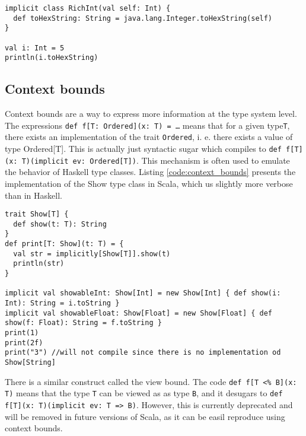 \begin{lstlisting}[caption=Implicit class, label=code:implicit_classes, float]
implicit class RichInt(val self: Int) {
  def toHexString: String = java.lang.Integer.toHexString(self)
}

val i: Int = 5
println(i.toHexString)
\end{lstlisting}

\subsection{Context bounds}
Context bounds are a way to express more information at the type system level. The expressions \texttt{def f[T: Ordered](x: T) = \ldots} means that for a given type\texttt{T}, there exists an implementation of the trait \texttt{Ordered}, i. e. there exists a value of type Ordered[T]. This is actually just syntactic sugar which compiles to \texttt{def f[T](x: T)(implicit ev: Ordered[T])}. This mechanism is often used to emulate the behavior of Haskell type classes. Listing \ref{code:context_bounds} presents the implementation of the Show type class in Scala, which us slightly more verbose than in Haskell.

\begin{lstlisting}[caption=Context bounds, label=code:context_bounds, float]
trait Show[T] {
  def show(t: T): String
}
def print[T: Show](t: T) = {
  val str = implicitly[Show[T]].show(t)
  println(str)
}

implicit val showableInt: Show[Int] = new Show[Int] { def show(i: Int): String = i.toString }
implicit val showableFloat: Show[Float] = new Show[Float] { def show(f: Float): String = f.toString }
print(1)
print(2f)
print("3") //will not compile since there is no implementation od Show[String]
\end{lstlisting}

There is a similar construct called the view bound. The code \texttt{def f[T <\% B](x: T)} means that the type \texttt{T} can be viewed as as type \texttt{B}, and it desugars to \texttt{def f[T](x: T)(implicit ev: T => B)}. However, this is currently deprecated and will be removed in future versions of Scala, as it can be easil reproduce using context bounds.

